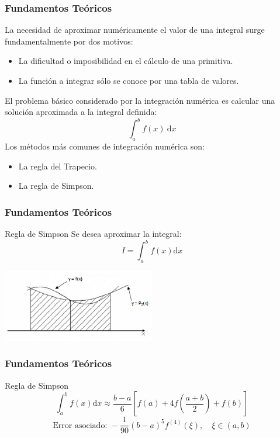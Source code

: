 \documentclass{beamer}
\begin{document}
\begin{frame}

  \frametitle{Fundamentos Teóricos}
  
  La necesidad de aproximar numéricamente el valor de una integral surge fundamentalmente por dos motivos:
  \begin{itemize}
    \item La dificultad o imposibilidad en el cálculo de una primitiva.
    \item La función a integrar sólo se conoce por una tabla de valores.
  \end{itemize}
  El problema básico considerado por la integración numérica es calcular una solución
  aproximada a la integral definida:
  \[\int_{a}^{b} f(x)\ \text{d}x \]
  Los métodos más comunes de integración numérica son:
  \begin{itemize}
    \item La regla del Trapecio.
    \item La regla de Simpson.
  \end{itemize}
  
\end{frame}
\begin{frame}
  
  \frametitle{Fundamentos Teóricos}
  
  \begin{block}{Regla de Simpson}
    Se desea aproximar la integral:
    \[ I = \int_{a}^{b} f(x) \text{d}x \]
    \begin{center}
      \includegraphics[width=0.50\textwidth]{img/Grafica_Simpson.eps}
    \end{center}  
  \end{block}
 
\end{frame}
\begin{frame}

  \frametitle{Fundamentos Teóricos}
  
  \begin{block}{Regla de Simpson}
    \[ \int_{a}^{b} f(x) \text{d}x \approx \frac{b-a}{6}\left[f(a) + 4f\left(\frac{a+b}{2}\right) + f(b)\right] \]
    \[\text{Error asociado: } -\frac{1}{90}(b-a)^5f^{(4)}(\xi), \quad \xi \in (a,b)\]
  \end{block}

\end{frame}
\end{document}
